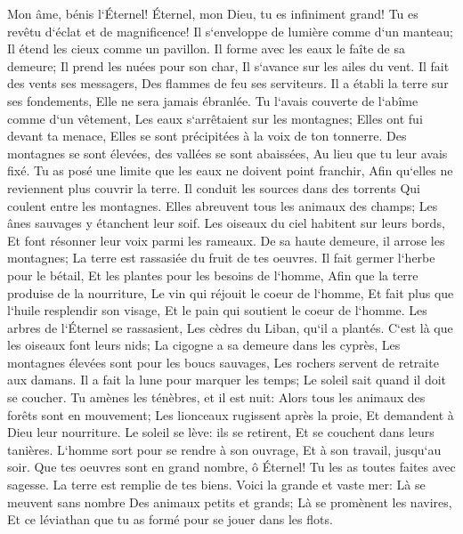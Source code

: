 \verse Mon âme, bénis l`Éternel! Éternel, mon Dieu, tu es infiniment grand! Tu es revêtu d`éclat et de magnificence! 
\verse Il s`enveloppe de lumière comme d`un manteau; Il étend les cieux comme un pavillon. 
\verse Il forme avec les eaux le faîte de sa demeure; Il prend les nuées pour son char, Il s`avance sur les ailes du vent. 
\verse Il fait des vents ses messagers, Des flammes de feu ses serviteurs. 
\verse Il a établi la terre sur ses fondements, Elle ne sera jamais ébranlée. 
\verse Tu l`avais couverte de l`abîme comme d`un vêtement, Les eaux s`arrêtaient sur les montagnes; 
\verse Elles ont fui devant ta menace, Elles se sont précipitées à la voix de ton tonnerre. 
\verse Des montagnes se sont élevées, des vallées se sont abaissées, Au lieu que tu leur avais fixé. 
\verse Tu as posé une limite que les eaux ne doivent point franchir, Afin qu`elles ne reviennent plus couvrir la terre. 
\verse Il conduit les sources dans des torrents Qui coulent entre les montagnes. 
\verse Elles abreuvent tous les animaux des champs; Les ânes sauvages y étanchent leur soif. 
\verse Les oiseaux du ciel habitent sur leurs bords, Et font résonner leur voix parmi les rameaux. 
\verse De sa haute demeure, il arrose les montagnes; La terre est rassasiée du fruit de tes oeuvres. 
\verse Il fait germer l`herbe pour le bétail, Et les plantes pour les besoins de l`homme, Afin que la terre produise de la nourriture, 
\verse Le vin qui réjouit le coeur de l`homme, Et fait plus que l`huile resplendir son visage, Et le pain qui soutient le coeur de l`homme. 
\verse Les arbres de l`Éternel se rassasient, Les cèdres du Liban, qu`il a plantés. 
\verse C`est là que les oiseaux font leurs nids; La cigogne a sa demeure dans les cyprès, 
\verse Les montagnes élevées sont pour les boucs sauvages, Les rochers servent de retraite aux damans. 
\verse Il a fait la lune pour marquer les temps; Le soleil sait quand il doit se coucher. 
\verse Tu amènes les ténèbres, et il est nuit: Alors tous les animaux des forêts sont en mouvement; 
\verse Les lionceaux rugissent après la proie, Et demandent à Dieu leur nourriture. 
\verse Le soleil se lève: ils se retirent, Et se couchent dans leurs tanières. 
\verse L`homme sort pour se rendre à son ouvrage, Et à son travail, jusqu`au soir. 
\verse Que tes oeuvres sont en grand nombre, ô Éternel! Tu les as toutes faites avec sagesse. La terre est remplie de tes biens. 
\verse Voici la grande et vaste mer: Là se meuvent sans nombre Des animaux petits et grands; 
\verse Là se promènent les navires, Et ce léviathan que tu as formé pour se jouer dans les flots. 
